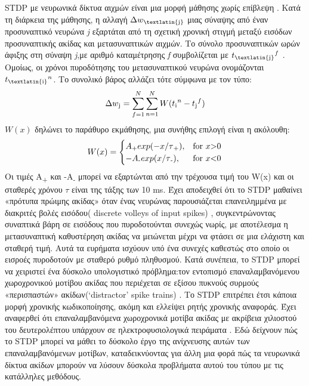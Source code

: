 \documentclass[12pt]{report}
\begin{document}
\textlatin{STDP} με νευρωνικά δίκτυα αιχμών είναι μια μορφή μάθησης χωρίς επίβλεψη . Κατά τη διάρκεια της μάθησης, η αλλαγή \(\Delta w\textsubscript{\textlatin{j}}\) μιας σύναψης από έναν προσυναπτικό νευρώνα \textit{\textlatin{j}} εξαρτάται από τη σχετική χρονική στιγμή μεταξύ εισόδων προσυναπτικής ακίδας και μετασυναπτικών αιχμών. Το σύνολο προσυναπτικών ωρών άφιξης στη σύναψη \textit{\textlatin{j}},με αριθμό καταμέτρησης \textit{\textlatin{f}} συμβολίζεται με \(t\textsubscript{\textlatin{j}}^f\) . 
Ομοίως, οι χρόνοι πυροδότησης του μετασυναπτικού νευρώνα ονομάζονται \(t\textsubscript{\textlatin{i}}^n\). Το συνολικό βάρος αλλάζει τότε \cite{Gerstner1996} σύμφωνα με τον τύπο: 
\begin{equation}
\Delta w\textsubscript{j}=\sum_{f=1}^N\sum_{n=1}^N W(t\textsubscript{i}^n-t\textsubscript{j}^f)
\end{equation}
\(W(x)\) δηλώνει το παράθυρο εκμάθησης, μια συνήθης επιλογή είναι η ακόλουθη:
$$
W(x)=\begin{cases}
			A\textsubscript{+}exp(-x/\tau\textsubscript{+}), & \text{for $x$\textgreater0}\\
            -A\textsubscript{-}exp(x/\tau\textsubscript{-}), & \text{for $x$\textless0}
		 \end{cases}
$$
Οι τιμές A\textsubscript{+} και -A\textsubscript{-} μπορεί να εξαρτώνται από την τρέχουσα τιμή του \textlatin{W}(\textlatin{x}) και οι σταθερές χρόνου \(\tau\) είναι της τάξης των 10 \textlatin{ms}. Έχει αποδειχθεί ότι το \textlatin{STDP} μαθαίνει «πρότυπα πρώιμης ακίδας» όταν ένας νευρώνας παρουσιάζεται επανειλημμένα με διακριτές βολές εισόδου( \textlatin{discrete volleys of input spikes}) , συγκεντρώνοντας συναπτικά βάρη σε εισόδους που πυροδοτούνται συνεχώς νωρίς, με αποτέλεσμα η μετασυναπτική καθυστέρηση ακίδας να μειώνεται μέχρι να φτάσει σε μια ελάχιστη και σταθερή τιμή. Αυτά τα ευρήματα ισχύουν υπό ένα συνεχές καθεστώς στο οποίο οι εισροές πυροδοτούν με σταθερό ρυθμό πληθυσμού. Κατά συνέπεια, το \textlatin{STDP} μπορεί να χειριστεί ένα δύσκολο υπολογιστικό πρόβλημα:τον εντοπισμό επαναλαμβανόμενου χωροχρονικού μοτίβου ακίδας που περιέχεται σε εξίσου πυκνούς συρμούς «περισπαστών» ακίδων(\textlatin{‘distractor' spike trains}) \cite{Masquelier2008}. Το \textlatin{STDP} επιτρέπει έτσι κάποια μορφή χρονικής κωδικοποίησης, ακόμη και ελλείψει ρητής χρονικής αναφοράς. Έχει αναφερθεί ότι επαναλαμβανόμενα χωροχρονικά μοτίβα ακίδας με ακρίβεια χιλιοστού του δευτερολέπτου υπάρχουν σε ηλεκτροφυσιολογικά πειράματα \cite{Fellous2004}. Εδώ \cite{Masquelier2008} δείχνουν πώς το \textlatin{STDP} μπορεί να μάθει το δύσκολο έργο της ανίχνευσης αυτών των επαναλαμβανόμενων μοτίβων, καταδεικνύοντας για άλλη μια φορά πώς τα νευρωνικά δίκτυα ακίδων μπορούν να λύσουν δύσκολα προβλήματα αυτού του τύπου με τις κατάλληλες μεθόδους.
\end{document}
